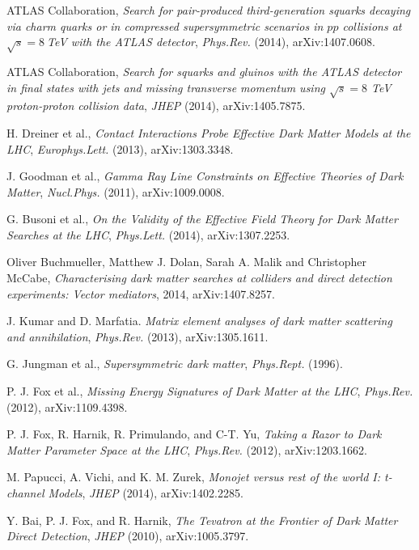ATLAS Collaboration, \emph{Search for pair-produced third-generation squarks decaying via charm quarks or in compressed supersymmetric scenarios in $pp$ collisions at $\sqrt{s}=8~$TeV with the ATLAS detector}, \emph{Phys.Rev.} (2014), arXiv:1407.0608.

ATLAS Collaboration, \emph{Search for squarks and gluinos with the ATLAS detector in final states with jets and missing transverse momentum using $\sqrt{s}=8$ TeV proton-proton collision data}, \emph{JHEP} (2014), arXiv:1405.7875.

H. Dreiner et al., \emph{Contact Interactions Probe Effective Dark Matter Models at the LHC}, \emph{Europhys.Lett.} (2013), arXiv:1303.3348.

J. Goodman et al., \emph{Gamma Ray Line Constraints on Effective Theories of Dark Matter}, \emph{Nucl.Phys.} (2011), arXiv:1009.0008.

G. Busoni et al., \emph{On the Validity of the Effective Field Theory for Dark Matter Searches at the LHC}, \emph{Phys.Lett.} (2014), arXiv:1307.2253. 

Oliver Buchmueller, Matthew J. Dolan, Sarah A. Malik and Christopher McCabe, \emph{Characterising dark matter searches at colliders and direct detection experiments: Vector mediators}, 2014, arXiv:1407.8257.

J. Kumar and D. Marfatia. \emph{Matrix element analyses of dark matter scattering and annihilation}, \emph{Phys.Rev.} (2013), arXiv:1305.1611.

G. Jungman et al., \emph{Supersymmetric dark matter}, \emph{Phys.Rept.} (1996).

P. J. Fox et al., \emph{Missing Energy Signatures of Dark Matter at the LHC}, \emph{Phys.Rev.} (2012), arXiv:1109.4398.

P. J. Fox, R. Harnik, R. Primulando, and C-T. Yu, \emph{Taking a Razor to Dark Matter Parameter Space at the LHC}, \emph{Phys.Rev.} (2012), arXiv:1203.1662.

M. Papucci, A. Vichi, and K. M. Zurek, \emph{Monojet versus rest of the world I: t-channel Models}, \emph{JHEP} (2014), arXiv:1402.2285.

Y. Bai, P. J. Fox, and R. Harnik, \emph{The Tevatron at the Frontier of Dark Matter Direct Detection}, \emph{JHEP} (2010), arXiv:1005.3797.

